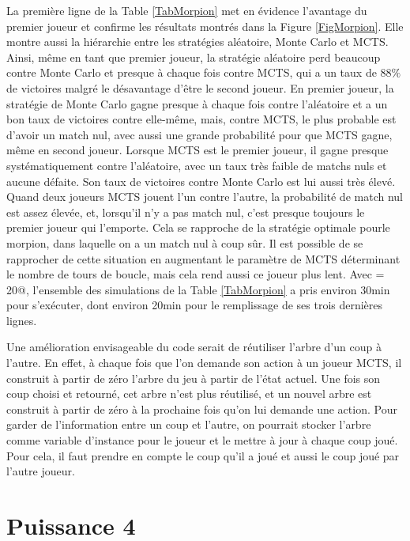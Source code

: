 \documentclass[a4paper,12pt]{article}
\begin{document}
La première ligne de la Table \ref{TabMorpion} met en évidence l'avantage du premier joueur et confirme les résultats montrés dans la Figure \ref{FigMorpion}. Elle montre aussi la hiérarchie entre les stratégies aléatoire, Monte Carlo et MCTS. Ainsi, même en tant que premier joueur, la stratégie aléatoire perd beaucoup contre Monte Carlo et presque à chaque fois contre MCTS, qui a un taux de $88\%$ de victoires malgré le désavantage d'être le second joueur. En premier joueur, la stratégie de Monte Carlo gagne presque à chaque fois contre l'aléatoire et a un bon taux de victoires contre elle-même, mais, contre MCTS, le plus probable est d'avoir un match nul, avec aussi une grande probabilité pour que MCTS gagne, même en second joueur. Lorsque MCTS est le premier joueur, il gagne presque systématiquement contre l'aléatoire, avec un taux très faible de matchs nuls et aucune défaite. Son taux de victoires contre Monte Carlo est lui aussi très élevé. Quand deux joueurs MCTS jouent l'un contre l'autre, la probabilité de match nul est assez élevée, et, lorsqu'il n'y a pas match nul, c'est presque toujours le premier joueur qui l'emporte. Cela se rapproche de la stratégie optimale pourle morpion, dans laquelle on a un match nul à coup sûr. Il est possible de se rapprocher de cette situation en augmentant le paramètre \verb@n@ de MCTS déterminant le nombre de tours de boucle, mais cela rend aussi ce joueur plus lent. Avec \verb@n = 20@, l'ensemble des simulations de la Table \ref{TabMorpion} a pris environ 30min pour s'exécuter, dont environ 20min pour le remplissage de ses trois dernières lignes.

Une amélioration envisageable du code serait de réutiliser l'arbre d'un coup à l'autre. En effet, à chaque fois que l'on demande son action à un joueur MCTS, il construit à partir de zéro l'arbre du jeu à partir de l'état actuel. Une fois son coup choisi et retourné, cet arbre n'est plus réutilisé, et un nouvel arbre est construit à partir de zéro à la prochaine fois qu'on lui demande une action. Pour garder de l'information entre un coup et l'autre, on pourrait stocker l'arbre comme variable d'instance pour le joueur et le mettre à jour à chaque coup joué. Pour cela, il faut prendre en compte le coup qu'il a joué et aussi le coup joué par l'autre joueur.

\section{Puissance 4}
\label{SecPuissance4}
\end{document}
